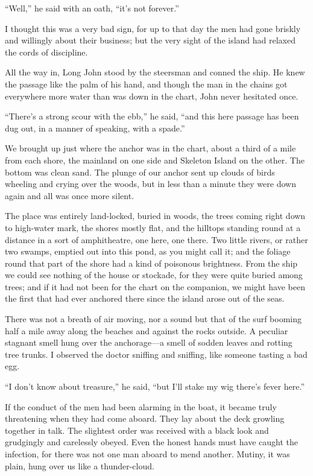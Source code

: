 \enquote{Well,} he said with an oath, \enquote{it’s not forever.}

I thought this was a very bad sign, for up to that day the men had gone briskly and willingly about their business; but the very sight of the island had relaxed the cords of discipline.

All the way in, Long John stood by the steersman and conned the ship. He knew the passage like the palm of his hand, and though the man in the chains got everywhere more water than was down in the chart, John never hesitated once.

\enquote{There’s a strong scour with the ebb,} he said, \enquote{and this here passage has been dug out, in a manner of speaking, with a spade.}

We brought up just where the anchor was in the chart, about a third of a mile from each shore, the mainland on one side and Skeleton Island on the other. The bottom was clean sand. The plunge of our anchor sent up clouds of birds wheeling and crying over the woods, but in less than a minute they were down again and all was once more silent.

The place was entirely land-locked, buried in woods, the trees coming right down to high-water mark, the shores mostly flat, and the hilltops standing round at a distance in a sort of amphitheatre, one here, one there. Two little rivers, or rather two swamps, emptied out into this pond, as you might call it; and the foliage round that part of the shore had a kind of poisonous brightness. From the ship we could see nothing of the house or stockade, for they were quite buried among trees; and if it had not been for the chart on the companion, we might have been the first that had ever anchored there since the island arose out of the seas.

There was not a breath of air moving, nor a sound but that of the surf booming half a mile away along the beaches and against the rocks outside. A peculiar stagnant smell hung over the an\-chor\-age---a smell of sodden leaves and rotting tree trunks. I observed the doctor sniffing and sniffing, like someone tasting a bad egg.

\enquote{I don’t know about treasure,} he said, \enquote{but I’ll stake my wig there’s fever here.}

If the conduct of the men had been alarming in the boat, it became truly threatening when they had come aboard. They lay about the deck growling together in talk. The slightest order was received with a black look and grudgingly and carelessly obeyed. Even the honest hands must have caught the infection, for there was not one man aboard to mend another. Mutiny, it was plain, hung over us like a thunder-cloud.


